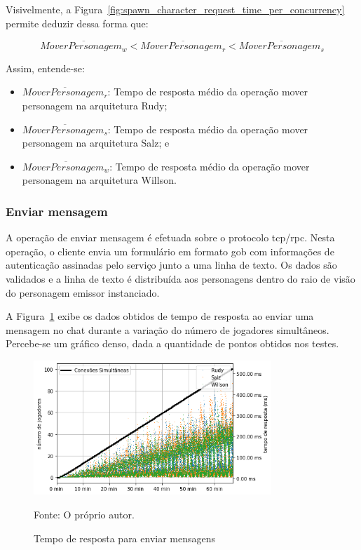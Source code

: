 Visivelmente, a Figura~\ref{fig:spawn_character_request_time_per_concurrency} permite deduzir dessa forma que:

$$
  \overline{MoverPersonagem_{w}} < \overline{MoverPersonagem_{r}} <\overline{MoverPersonagem_{s}}
$$

Assim, entende-se:

\begin{itemize}
 \item $\overline{MoverPersonagem_{r}}$: Tempo de resposta médio da operação mover personagem na arquitetura Rudy;
 \item $\overline{MoverPersonagem_{s}}$: Tempo de resposta médio da operação mover personagem na arquitetura Salz; e
 \item $\overline{MoverPersonagem_{w}}$: Tempo de resposta médio da operação mover personagem na arquitetura Willson.
\end{itemize}


\subsubsection{Enviar mensagem}

A operação de enviar mensagem é efetuada sobre o protocolo \ac{tcp}/\ac{rpc}.
%
Nesta operação, o cliente envia um formulário em formato \ac{gob} com informações de autenticação assinadas pelo serviço junto a uma linha de texto.
%
Os dados são validados e a linha de texto é distribuída aos personagens dentro do raio de visão do personagem emissor instanciado.

A Figura~\ref{fig:send_chat_request_time} exibe os dados obtidos de tempo de resposta ao enviar uma mensagem no chat durante a variação do número de jogadores simultâneos.
%
Percebe-se um gráfico denso, dada a quantidade de pontos obtidos nos testes.

\begin{figure}[htb!]
  \caption{Tempo de resposta para enviar mensagens}
  \label{fig:send_chat_request_time}
  \includegraphics[width=0.8\textwidth]{figuras/analise/rt/send_chat_request_time}
  \centering

  Fonte: O próprio autor.
\end{figure}


